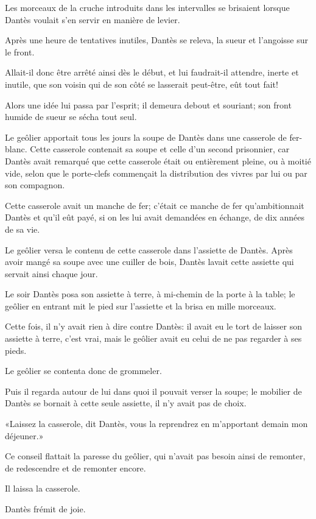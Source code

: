 Les morceaux de la cruche introduits dans les intervalles se brisaient lorsque Dantès voulait s'en servir en manière de levier.

Après une heure de tentatives inutiles, Dantès se releva, la sueur et l'angoisse sur le front.

Allait-il donc être arrêté ainsi dès le début, et lui faudrait-il attendre, inerte et inutile, que son voisin qui de son côté se lasserait peut-être, eût tout fait!

Alors une idée lui passa par l'esprit; il demeura debout et souriant; son front humide de sueur se sécha tout seul.

Le geôlier apportait tous les jours la soupe de Dantès dans une casserole de fer-blanc. Cette casserole contenait sa soupe et celle d'un second prisonnier, car Dantès avait remarqué que cette casserole était ou entièrement pleine, ou à moitié vide, selon que le porte-clefs commençait la distribution des vivres par lui ou par son compagnon.

Cette casserole avait un manche de fer; c'était ce manche de fer qu'ambitionnait Dantès et qu'il eût payé, si on les lui avait demandées en échange, de dix années de sa vie.

Le geôlier versa le contenu de cette casserole dans l'assiette de Dantès. Après avoir mangé sa soupe avec une cuiller de bois, Dantès lavait cette assiette qui servait ainsi chaque jour.

Le soir Dantès posa son assiette à terre, à mi-chemin de la porte à la table; le geôlier en entrant mit le pied sur l'assiette et la brisa en mille morceaux.

Cette fois, il n'y avait rien à dire contre Dantès: il avait eu le tort de laisser son assiette à terre, c'est vrai, mais le geôlier avait eu celui de ne pas regarder à ses pieds.

Le geôlier se contenta donc de grommeler.

Puis il regarda autour de lui dans quoi il pouvait verser la soupe; le mobilier de Dantès se bornait à cette seule assiette, il n'y avait pas de choix.

«Laissez la casserole, dit Dantès, vous la reprendrez en m'apportant demain mon déjeuner.»

Ce conseil flattait la paresse du geôlier, qui n'avait pas besoin ainsi de remonter, de redescendre et de remonter encore.

Il laissa la casserole.

Dantès frémit de joie.

